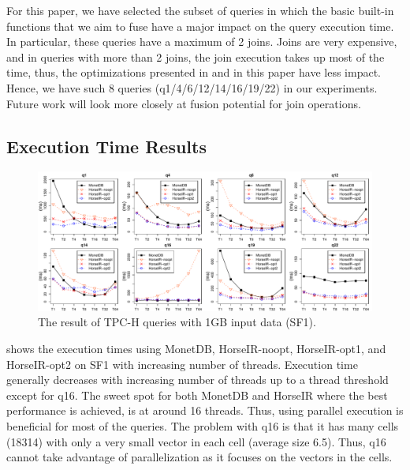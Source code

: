 For this paper, we have selected the subset of queries in which the basic built-in
functions that we aim to fuse have a major impact on the query execution time.
In particular, these queries have a maximum of 2 joins. Joins are very
expensive, and in queries with more than 2 joins, the join execution takes up
most of the time, thus, the optimizations presented in \OldPaper and in this
paper have less impact.
Hence, we have such 8 queries (q1/4/6/12/14/16/19/22) in our experiments.
Future work will look more closely at fusion potential for join operations.  



\subsection{Execution Time Results}

\begin{figure}[htbp]
\centering
\includegraphics[width=\textwidth]{./src/figure/sf1-v2.pdf}
\caption{The result of TPC-H queries with 1GB input data (SF1).}
\label{fig:tpch_result}
\end{figure}


 shows the execution times using MonetDB, HorseIR-noopt,
HorseIR-opt1, and HorseIR-opt2 on SF1 with increasing number of threads. 
Execution time generally decreases with increasing number of threads up to a
thread threshold except for q16. The sweet spot for both MonetDB and HorseIR
where the best performance is achieved, is at around 16 threads. Thus, using
parallel execution is beneficial for most of the queries. The problem with q16
is that it has many cells (18314) with only a very small vector in each cell
(average size 6.5). Thus, q16 cannot take advantage of parallelization as it
focuses on the vectors in the cells. 

